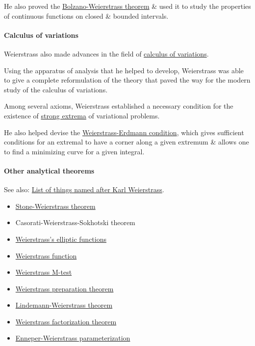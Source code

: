 \documentclass{article}
\begin{document}
He also proved the \href{https://en.wikipedia.org/wiki/Bolzano-Weierstrass_theorem}{Bolzano-Weierstrass theorem} \& used it to study the properties of continuous functions on closed \& bounded intervals.

\paragraph{Calculus of variations}
Weierstrass also made advances in the field of \href{https://en.wikipedia.org/wiki/Calculus_of_variations}{calculus of variations}.

Using the apparatus of analysis that he helped to develop, Weierstrass was able to give a complete reformulation of the theory that paved the way for the modern study of the calculus of variations.

Among several axioms, Weierstrass established a necessary condition for the existence of \href{https://en.wikipedia.org/wiki/Strong_extrema}{strong extrema} of variational problems.

He also helped devise the \href{https://en.wikipedia.org/wiki/Weierstrass-Erdmann_condition}{Weierstrass-Erdmann condition}, which gives sufficient conditions for an extremal to have a corner along a given extremum \& allows one to find a minimizing curve for a given integral.

\paragraph{Other analytical theorems}
See also: \href{https://en.wikipedia.org/wiki/List_of_things_named_after_Karl_Weierstrass}{List of things named after Karl Weierstrass}.
\begin{itemize}
	\item \href{https://en.wikipedia.org/wiki/Stone-Weierstrass_theorem}{Stone-Weierstrass theorem}
	\item Casorati-Weierstrass-Sokhotski theorem
	\item \href{https://en.wikipedia.org/wiki/Weierstrass's_elliptic_functions}{Weierstrass's elliptic functions}
	\item \href{https://en.wikipedia.org/wiki/Weierstrass\_function}{Weierstrass function}
	\item \href{https://en.wikipedia.org/wiki/Weierstrass_M-test}{Weierstrass M-test}
	\item \href{https://en.wikipedia.org/wiki/Weierstrass_preparation_theorem}{Weierstrass preparation theorem}
	\item \href{https://en.wikipedia.org/wiki/Lindemann-Weierstrass_theorem}{Lindemann-Weierstrass theorem}
	\item \href{https://en.wikipedia.org/wiki/Weierstrass_factorization_theorem}{Weierstrass factorization theorem}
	\item \href{https://en.wikipedia.org/wiki/Enneper-Weierstrass_parameterization}{Enneper-Weierstrass parameterization}
\end{itemize}
\end{document}
